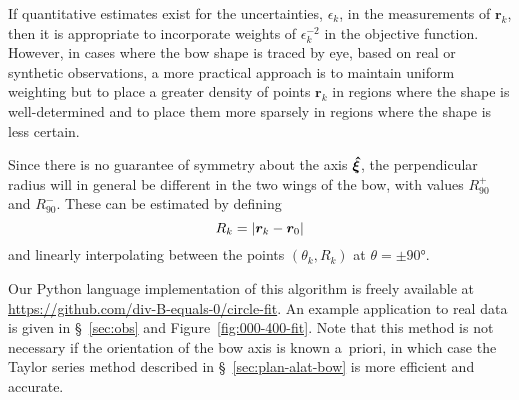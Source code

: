 If quantitative estimates exist for the uncertainties, \(\epsilon_k\), in the
measurements of \(\bm{r}_k\), then it is appropriate to incorporate
weights of \(\epsilon_k^{-2}\) in the objective function.  However, in cases
where the bow shape is traced by eye, based on real or synthetic
observations, a more practical approach is to maintain uniform
weighting but to place a greater density of points \(\bm{r}_k\) in
regions where the shape is well-determined and to place them more
sparsely in regions where the shape is less certain.

Since there is no guarantee of symmetry about the axis \(\bm{\hat{\xi}}\),
the perpendicular radius will in general be different in the two wings
of the bow, with values \(R_{90}^+\) and \(R_{90}^-\).  These can be
estimated by defining
\begin{equation}
  \label{eq:rcurv-R-k}
  R_k = \left\lvert\bm{r}_k - \bm{r}_0\right\rvert
\end{equation}
and linearly interpolating between the points \((\theta_k, R_k)\) at
\(\theta = \pm \ang{90}\).

Our Python language implementation of this algorithm is freely
available at \url{https://github.com/div-B-equals-0/circle-fit}.  An
example application to real data is given in \S~\ref{sec:obs} and
Figure~\ref{fig:000-400-fit}.  Note that this method is not necessary
if the orientation of the bow axis is known a~priori, in which case
the Taylor series method described in \S~\ref{sec:plan-alat-bow} is
more efficient and accurate.


